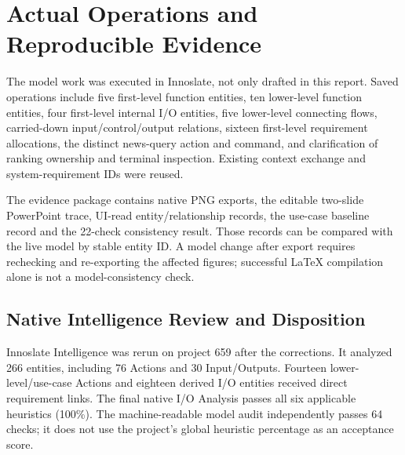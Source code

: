 \documentclass[11pt,letterpaper]{article}
\begin{document}
\section{Actual Operations and Reproducible Evidence}
The model work was executed in Innoslate, not only drafted in this report. Saved operations include five first-level function entities, ten lower-level function entities, four first-level internal I/O entities, five lower-level connecting flows, carried-down input/control/output relations, sixteen first-level requirement allocations, the distinct news-query action and command, and clarification of ranking ownership and terminal inspection. Existing context exchange and system-requirement IDs were reused.

The evidence package contains native PNG exports, the editable two-slide PowerPoint trace, UI-read entity/relationship records, the use-case baseline record and the 22-check consistency result. Those records can be compared with the live model by stable entity ID. A model change after export requires rechecking and re-exporting the affected figures; successful LaTeX compilation alone is not a model-consistency check.

\subsection{Native Intelligence Review and Disposition}
Innoslate Intelligence was rerun on project 659 after the corrections. It analyzed 266 entities, including 76 Actions and 30 Input/Outputs. Fourteen lower-level/use-case Actions and eighteen derived I/O entities received direct requirement links. The final native I/O Analysis passes all six applicable heuristics (100\%). The machine-readable model audit independently passes 64 checks; it does not use the project's global heuristic percentage as an acceptance score.
\end{document}
